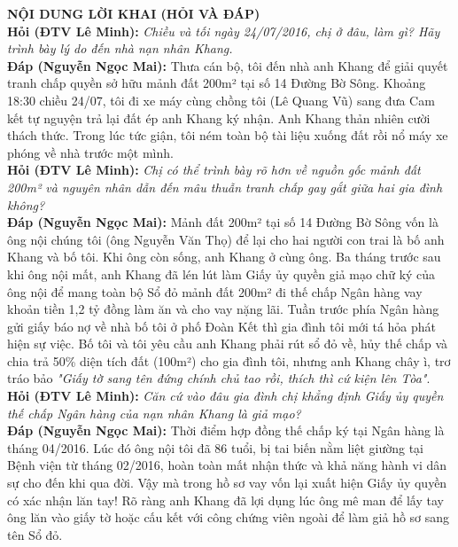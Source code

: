 \documentclass[12pt,a4paper]{article}
\begin{document}
\vspace{0.3cm}\noindent\textbf{\large NỘI DUNG LỜI KHAI (HỎI VÀ ĐÁP)}\\[0.15cm]


\noindent\textbf{Hỏi (ĐTV Lê Minh):} \textit{Chiều và tối ngày 24/07/2016, chị ở đâu, làm gì? Hãy trình bày lý do đến nhà nạn nhân Khang.}\\[0.15cm]
\noindent\textbf{Đáp (Nguyễn Ngọc Mai):} Thưa cán bộ, tôi đến nhà anh Khang để giải quyết tranh chấp quyền sở hữu mảnh đất 200m² tại số 14 Đường Bờ Sông. Khoảng 18:30 chiều 24/07, tôi đi xe máy cùng chồng tôi (Lê Quang Vũ) sang đưa Cam kết tự nguyện trả lại đất ép anh Khang ký nhận. Anh Khang thản nhiên cười thách thức. Trong lúc tức giận, tôi ném toàn bộ tài liệu xuống đất rồi nổ máy xe phóng về nhà trước một mình.\\[0.35cm]

\noindent\textbf{Hỏi (ĐTV Lê Minh):} \textit{Chị có thể trình bày rõ hơn về nguồn gốc mảnh đất 200m² và nguyên nhân dẫn đến mâu thuẫn tranh chấp gay gắt giữa hai gia đình không?}\\[0.15cm]
\noindent\textbf{Đáp (Nguyễn Ngọc Mai):} Mảnh đất 200m² tại số 14 Đường Bờ Sông vốn là ông nội chúng tôi (ông Nguyễn Văn Thọ) để lại cho hai người con trai là bố anh Khang và bố tôi. Khi ông còn sống, anh Khang ở cùng ông. Ba tháng trước sau khi ông nội mất, anh Khang đã lén lút làm Giấy ủy quyền giả mạo chữ ký của ông nội để mang toàn bộ Sổ đỏ mảnh đất 200m² đi thế chấp Ngân hàng vay khoản tiền 1,2 tỷ đồng làm ăn và cho vay nặng lãi. Tuần trước phía Ngân hàng gửi giấy báo nợ về nhà bố tôi ở phố Đoàn Kết thì gia đình tôi mới tá hỏa phát hiện sự việc. Bố tôi và tôi yêu cầu anh Khang phải rút sổ đỏ về, hủy thế chấp và chia trả 50\% diện tích đất (100m²) cho gia đình tôi, nhưng anh Khang chây ì, trơ tráo bảo \textit{"Giấy tờ sang tên đứng chính chủ tao rồi, thích thì cứ kiện lên Tòa"}.\\[0.35cm]

\noindent\textbf{Hỏi (ĐTV Lê Minh):} \textit{Căn cứ vào đâu gia đình chị khẳng định Giấy ủy quyền thế chấp Ngân hàng của nạn nhân Khang là giả mạo?}\\[0.15cm]
\noindent\textbf{Đáp (Nguyễn Ngọc Mai):} Thời điểm hợp đồng thế chấp ký tại Ngân hàng là tháng 04/2016. Lúc đó ông nội tôi đã 86 tuổi, bị tai biến nằm liệt giường tại Bệnh viện từ tháng 02/2016, hoàn toàn mất nhận thức và khả năng hành vi dân sự cho đến khi qua đời. Vậy mà trong hồ sơ vay vốn lại xuất hiện Giấy ủy quyền có xác nhận lăn tay! Rõ ràng anh Khang đã lợi dụng lúc ông mê man để lấy tay ông lăn vào giấy tờ hoặc cấu kết với công chứng viên ngoài để làm giả hồ sơ sang tên Sổ đỏ.\\[0.35cm]
\end{document}
